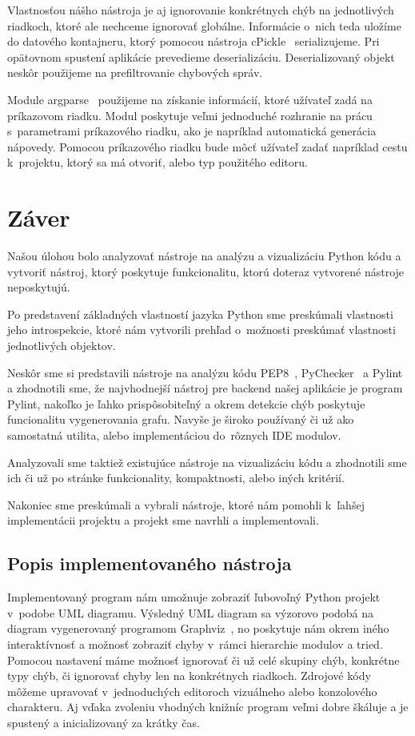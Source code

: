 \documentclass[11pt,oneside,final]{fithesis2}
\begin{document}
	Vlastnosťou nášho nástroja je aj ignorovanie konkrétnych chýb na jednotlivých riadkoch, ktoré ale nechceme ignorovať globálne. Informácie o~nich teda uložíme do datového kontajneru, ktorý pomocou nástroja cPickle~\cite{cpickle} serializujeme. Pri opätovnom spustení aplikácie prevedieme deserializáciu. Deserializovaný objekt neskôr použijeme na prefiltrovanie chybových správ.
	
		Module argparse~\cite{argparse} použijeme na získanie informácií, ktoré užívateľ zadá na príkazovom riadku. Modul poskytuje veľmi jednoduché rozhranie na prácu s~parametrami príkazového riadku, ako je napríklad automatická generácia nápovedy. Pomocou príkazového riadku bude môcť užívateľ zadať napríklad cestu k~projektu, ktorý sa má otvoriť, alebo typ použitého editoru.
				
\chapter{Záver}

	Našou úlohou bolo analyzovať nástroje na analýzu a vizualizáciu Python kódu a vytvoriť nástroj, ktorý poskytuje funkcionalitu, ktorú doteraz vytvorené nástroje neposkytujú.
	
	Po predstavení základných vlastností jazyka Python sme preskúmali vlastnosti jeho introspekcie, ktoré nám vytvorili prehľad o~možnosti preskúmať vlastnosti jednotlivých objektov.
	
	Neskôr sme si predstavili nástroje na analýzu kódu PEP8~\cite{pep8}, PyChecker~\cite{pychecker} a Pylint~\cite{pylint} a zhodnotili sme, že najvhodnejší nástroj pre backend našej aplikácie je program Pylint, nakoľko je ľahko prispôsobiteľný a okrem detekcie chýb poskytuje funcionalitu vygenerovania grafu. Navyše je široko používaný či už ako samostatná utilita, alebo implementáciou do~rôznych IDE modulov.
	
	Analyzovali sme taktiež existujúce nástroje na vizualizáciu kódu a zhodnotili sme ich či už po stránke funkcionality, kompaktnosti, alebo iných kritérií.
	
	Nakoniec sme preskúmali a vybrali nástroje, ktoré nám pomohli k~ľahšej implementácii projektu a projekt sme navrhli a implementovali.
	\section{Popis implementovaného nástroja}
	Implementovaný program nám umožnuje zobraziť ľubovoľný Python projekt v~podobe UML diagramu.  Výsledný UML diagram sa výzorovo podobá na diagram vygenerovaný programom Graphviz~\cite{graphviz}, no poskytuje nám okrem iného interaktívnosť a možnosť zobraziť chyby v~rámci hierarchie modulov a tried. Pomocou nastavení máme možnosť ignorovať či už celé skupiny chýb, konkrétne typy chýb, či ignorovať chyby len na konkrétnych riadkoch. Zdrojové kódy môžeme upravovať v~jednoduchých editoroch vizuálneho alebo konzolového charakteru. Aj vďaka zvoleniu vhodných knižníc program veľmi dobre škáluje a je spustený a inicializovaný za krátky čas.
	
\end{document}
